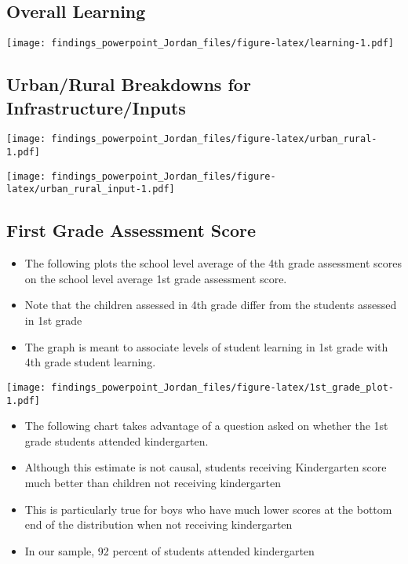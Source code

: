 \documentclass[
]{article}
\providecommand{\tightlist}{%
  \setlength{\itemsep}{0pt}\setlength{\parskip}{0pt}}
\begin{document}
\hypertarget{overall-learning}{%
\subsection{Overall Learning}\label{overall-learning}}

\texttt{[image: findings\_powerpoint\_Jordan\_files/figure-latex/learning-1.pdf]}

\hypertarget{urbanrural-breakdowns-for-infrastructureinputs}{%
\subsection{Urban/Rural Breakdowns for
Infrastructure/Inputs}\label{urbanrural-breakdowns-for-infrastructureinputs}}

\texttt{[image: findings\_powerpoint\_Jordan\_files/figure-latex/urban\_rural-1.pdf]}

\texttt{[image: findings\_powerpoint\_Jordan\_files/figure-latex/urban\_rural\_input-1.pdf]}

\hypertarget{first-grade-assessment-score}{%
\subsection{First Grade Assessment
Score}\label{first-grade-assessment-score}}

\begin{itemize}
\tightlist
\item
  The following plots the school level average of the 4th grade
  assessment scores on the school level average 1st grade assessment
  score.\\
\item
  Note that the children assessed in 4th grade differ from the students
  assessed in 1st grade\\
\item
  The graph is meant to associate levels of student learning in 1st
  grade with 4th grade student learning.
\end{itemize}

\texttt{[image: findings\_powerpoint\_Jordan\_files/figure-latex/1st\_grade\_plot-1.pdf]}

\begin{itemize}
\tightlist
\item
  The following chart takes advantage of a question asked on whether the
  1st grade students attended kindergarten.
\item
  Although this estimate is not causal, students receiving Kindergarten
  score much better than children not receiving kindergarten\\
\item
  This is particularly true for boys who have much lower scores at the
  bottom end of the distribution when not receiving kindergarten
\item
  In our sample, 92 percent of students attended kindergarten
\end{itemize}
\end{document}
